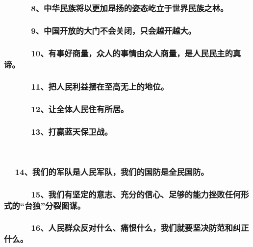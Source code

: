 \documentclass[11pt]{ctexart}
\begin{document}
{{{{\subsubsection{　 　　8、中华民族将以更加昂扬的姿态屹立于世界民族之林。}
\label{sec:org853148a}

\subsubsection{　 　　9、中国开放的大门不会关闭，只会越开越大。}
\label{sec:org0113d04}

\subsubsection{　　 　10、有事好商量，众人的事情由众人商量，是人民民主的真谛。}
\label{sec:org08766b9}

\subsubsection{　 　　11、把人民利益摆在至高无上的地位。}
\label{sec:org34bc3ab}

\subsubsection{　 　　12、让全体人民住有所居。}
\label{sec:org062becb}

\subsubsection{　 　　13、打赢蓝天保卫战。}
\label{sec:org0aca712}
　　
\subsubsection{　     14、我们的军队是人民军队，我们的国防是全民国防。}
\label{sec:orga5c56a8}

\subsubsection{　 　　15、我们有坚定的意志、充分的信心、足够的能力挫败任何形式的“台独”分裂图谋。}
\label{sec:orga9a25a9}

\subsubsection{　 　　16、人民群众反对什么、痛恨什么，我们就要坚决防范和纠正什么。}
\label{sec:org15b396c}

}}}}
\end{document}
